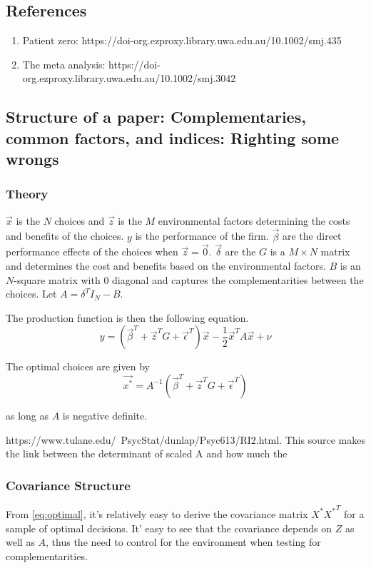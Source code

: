 \documentclass[]{article} %
\begin{document}
\subsection{References}

\begin{enumerate}
    \item Patient zero: https://doi-org.ezproxy.library.uwa.edu.au/10.1002/smj.435
    \item The meta analysis: https://doi-org.ezproxy.library.uwa.edu.au/10.1002/smj.3042
\end{enumerate}

\subsection{Structure of a paper: Complementaries, common factors, and indices: Righting some wrongs}

\subsubsection{Theory}

$\vec{x}$ is the $N$ choices and $\vec{z}$ is the $M$ environmental factors determining the costs and benefits of the choices. $y$ is the performance of the firm. $\vec{\beta}$ are the direct performance effects of the choices when $\vec{z} = \vec{0}$. $\vec{\delta}$ are the 
$G$ is a $M \times N$ matrix and determines the cost and benefits based on the environmental factors. $B$ is an $N$-square matrix with $0$ diagonal and captures the complementarities between the choices. Let $A = \delta^T I_N - B$. 

The production function is then the following equation.
\begin{equation}
\label{eq:production}
    y = (\vec{\beta}^T + \vec{z}^T G + \vec{\epsilon}^T) \vec{x} 
         - \frac{1}{2} \vec{x}^T A \vec{x} + \nu
\end{equation}

The optimal choices are given by 
\begin{equation}
\label{eq:optimal}
    \vec{x^*} = A^{-1}(\vec{\beta}^T + \vec{z}^T G + \vec{\epsilon}^T) 
\end{equation}

as long as $A$ is negative definite.

https://www.tulane.edu/~PsycStat/dunlap/Psyc613/RI2.html. This source makes the link between the determinant of scaled A and how much the 

\subsubsection{Covariance Structure}
From \ref{eq:optimal}, it's relatively easy to derive the covariance matrix
$X^*{X^{*}}^T$ for a sample of optimal decisions. It' easy to see that the covariance depends on $Z$ as well as $A$, thus the need to control for the environment when testing 
for complementarities.
\end{document}
